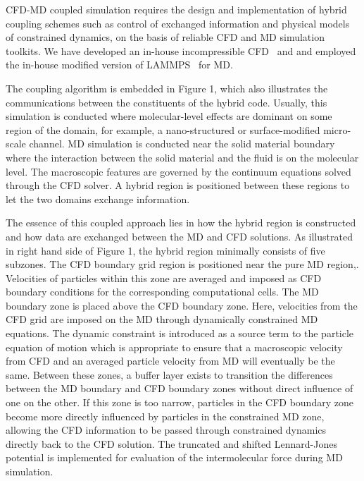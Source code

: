 \documentclass[conference,final]{IEEEtran}
\begin{document}
CFD-MD coupled simulation requires the design and implementation of hybrid coupling schemes such as control of exchanged information and physical models of constrained dynamics, on the basis of reliable CFD and MD simulation toolkits. We have developed an in-house incompressible CFD~\cite{Lee:2006} and and employed the in-house modified version of LAMMPS~\cite{LAMMPS} for MD. 

The coupling algorithm is embedded in Figure 1, which also illustrates the communications between the constituents of the hybrid code. Usually, this simulation is conducted where molecular-level effects are dominant on some region of the domain, for example, a nano-structured or surface-modified micro-scale channel. MD simulation is conducted near the solid material boundary where the interaction between the solid material and the fluid is on the molecular level. The macroscopic features are governed by the continuum equations solved through the CFD solver. A hybrid region is positioned between these regions to let the two domains exchange information.

The essence of this coupled approach lies in how the hybrid region is constructed and how data are exchanged between the MD and CFD solutions. As illustrated in right hand side of Figure 1, the hybrid region minimally consists of five subzones. The CFD boundary grid region is positioned near the pure MD region,. Velocities of particles within this zone are averaged and imposed as CFD boundary conditions for the corresponding computational cells. The MD boundary zone is placed above the CFD boundary zone. Here, velocities from the CFD grid are imposed on the MD through dynamically constrained MD equations. The dynamic constraint is introduced as a source term to the particle equation of motion which is appropriate to ensure that a macroscopic velocity from CFD and an averaged particle velocity from MD will eventually be the same. Between these zones, a buffer layer exists to transition the differences between the MD boundary and CFD boundary zones without direct influence of one on the other. If this zone is too narrow, particles in the CFD boundary zone become more directly influenced by particles in the constrained MD zone, allowing the CFD information to be passed through constrained dynamics directly back to the CFD solution. The truncated and shifted Lennard-Jones potential is implemented for evaluation of the intermolecular force during MD simulation.
\end{document}

